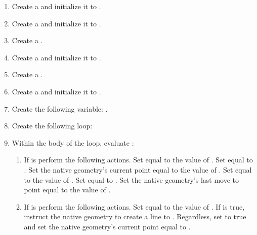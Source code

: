 \pnum
	\begin{enumerate}
	\item
	Create a  and initialize it to .
	
	\item
	Create a  and initialize it to .
	
	\item
	Create a .
	
	\item
	Create a  and initialize it to .
	
	\item
	Create a .
	
	\item
	Create a  and initialize it to .
	
	\item
	Create the following variable: .
	
	\item
	Create the following loop: 
	
	\item
	Within the body of the loop, evaluate :
	
	\begin{enumerate}
	\item
	If  is  perform the following actions. Set  equal to the value of . Set  equal to . Set the native geometry's current point equal to the value of . Set  equal to the value of . Set  equal to . Set the native geometry's last move to point equal to the value of .
	
	\item
	If  is  perform the following actions. Set  equal to the value of . If  is true, instruct the native geometry to create a line to . Regardless, set  to true and set the native geometry's current point equal to .
	

\end{enumerate}
\end{enumerate}
